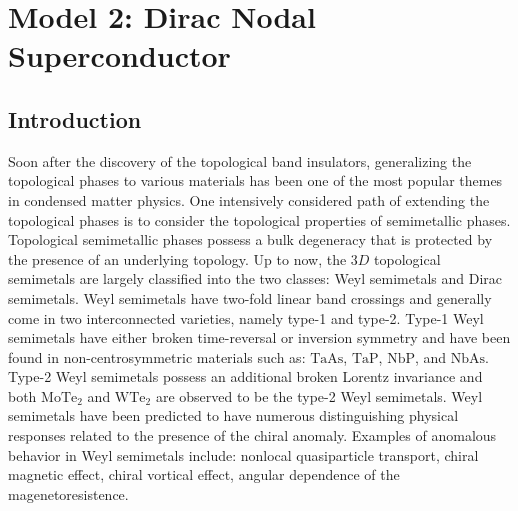\chapter{Model 2: Dirac Nodal Superconductor}\label{chap:Model2}
\section{Introduction}
Soon after the discovery of the topological band insulators\cite{RevModPhys.82.3045,RevModPhys.83.1057}, generalizing the topological phases to various materials has been one of the most popular themes in condensed matter physics\cite{RevModPhys.88.035005,doi:10.1002/pssr.201206451,doi:10.1146/annurev-conmatphys-031214-014749,doi:10.1146/annurev-conmatphys-031214-014501}. One intensively considered path of extending the topological phases is to consider the topological properties of semimetallic phases. Topological semimetallic phases possess a bulk degeneracy that is protected by the presence of an underlying topology. Up to now, the $3D$ topological semimetals are largely classified into the two classes: Weyl semimetals and Dirac semimetals. Weyl semimetals have two-fold linear band crossings and generally come in two interconnected varieties, namely type-1 and type-2. Type-1 Weyl semimetals have  either broken time-reversal or inversion symmetry and have been found in non-centrosymmetric materials such as: $\mathrm{TaAs}$\cite{PhysRevX.5.031013}, $\mathrm{TaP}$, $\mathrm{NbP}$, and $\mathrm{NbAs}$\cite{Liu2015,Xu2015}. Type-2 Weyl semimetals possess an additional broken Lorentz invariance and both $\mathrm{MoTe_2}$\cite{MoTe,MoTe2} and $\mathrm{WTe_2}$\cite{WTe,WTe2} are observed to be the type-2 Weyl semimetals\cite{type2}. Weyl semimetals have been predicted to have numerous distinguishing physical responses related to the presence of the chiral anomaly\cite{PhysRev.177.2426,Bell1969,Nielsen1983}. Examples of anomalous behavior in Weyl semimetals include: nonlocal quasiparticle transport\cite{PhysRevX.4.031035}, chiral magnetic effect\cite{Li2016,PhysRevB.92.161110,PhysRevB.89.081407}, chiral vortical effect\cite{PhysRevB.89.075124}, angular dependence of the magenetoresistence\cite{PhysRevX.5.031023,PhysRevB.88.104412}.

